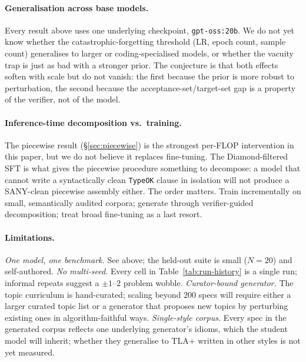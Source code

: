 \documentclass[11pt]{article}
\begin{document}
\paragraph{Generalisation across base models.} Every result above uses
one underlying checkpoint, \texttt{gpt-oss:20b}. We do not yet know
whether the catastrophic-forgetting threshold (LR, epoch count, sample
count) generalises to larger or coding-specialised models, or whether
the vacuity trap is just as bad with a stronger prior. The conjecture
is that both effects soften with scale but do not vanish: the first
because the prior is more robust to perturbation, the second because
the acceptance-set/target-set gap is a property of the verifier, not
of the model.

\paragraph{Inference-time decomposition vs.\ training.} The piecewise
result (\S\ref{sec:piecewise}) is the strongest per-FLOP intervention
in this paper, but we do not believe it replaces fine-tuning. The
Diamond-filtered SFT is what gives the piecewise procedure something
to decompose: a model that cannot write a syntactically clean
\texttt{TypeOK} clause in isolation will not produce a SANY-clean
piecewise assembly either. The order matters. Train incrementally on
small, semantically audited corpora; generate through verifier-guided
decomposition; treat broad fine-tuning as a last resort.

\paragraph{Limitations.}
\emph{One model, one benchmark.} See above; the held-out suite is
small ($N=20$) and self-authored. \emph{No multi-seed.} Every cell in
Table~\ref{tab:run-history} is a single run; informal repeats suggest
a $\pm 1$--$2$ problem wobble. \emph{Curator-bound generator.} The
topic curriculum is hand-curated; scaling beyond $200$ specs will
require either a larger curated topic list or a generator that
proposes new topics by perturbing existing ones in algorithm-faithful
ways. \emph{Single-style corpus.} Every spec in the generated corpus
reflects one underlying generator's idioms, which the student model
will inherit; whether they generalise to TLA+ written in other styles
is not yet measured.
\end{document}

